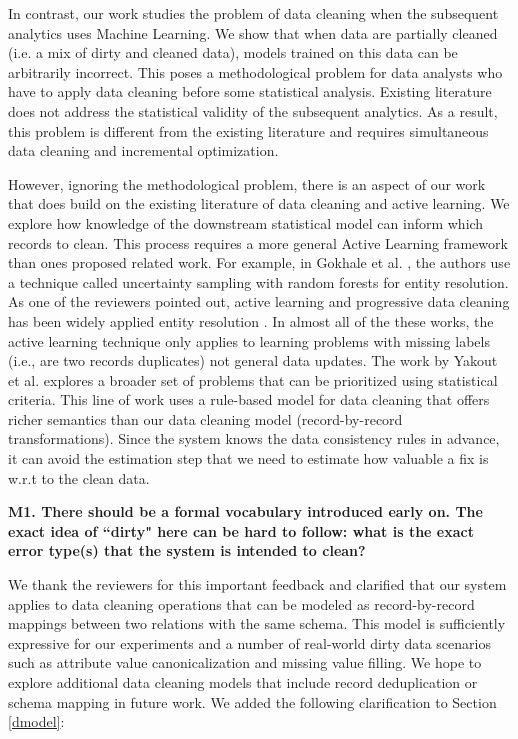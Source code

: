 In contrast, our work studies the problem of data cleaning when the subsequent analytics uses Machine Learning.
We show that when data are partially cleaned (i.e. a mix of dirty and cleaned data), models trained on this data can be arbitrarily incorrect.
This poses a methodological problem for data analysts who have to apply data cleaning before some statistical analysis.
Existing literature does not address the statistical validity of the subsequent analytics.
As a result, this problem is different from the existing literature and requires simultaneous data cleaning and incremental optimization.

However, ignoring the methodological problem, there is an aspect of our work that does build on the existing literature of data cleaning and active learning.
We explore how knowledge of the downstream statistical model can inform which records to clean.
This process requires a more general Active Learning framework than ones proposed related work.
For example, in Gokhale et al. \cite{gokhale2014corleone}, the authors use a technique called uncertainty sampling with random forests for entity resolution.
As one of the reviewers pointed out, active learning and progressive data cleaning has been widely applied entity resolution \cite{whang2014incremental, papenbrock2015progressive, gruenheid2014incremental}.
In almost all of the these works, the active learning technique only applies to learning problems with missing labels (i.e., are two records duplicates) not general data updates.
The work by Yakout et al. \cite{DBLP:journals/pvldb/YakoutENOI11, yakout2013don} explores a broader set of problems that can be prioritized using statistical criteria.
This line of work uses a rule-based model for data cleaning that offers richer semantics than our data cleaning model (record-by-record transformations).
Since the system knows the data consistency rules in advance, it can avoid the estimation step 
that we need to estimate how valuable a fix is w.r.t to the clean data. 

\vspace{0.5em}

\noindent\noindent \textbf{M1. There should be a formal vocabulary introduced early on. The exact idea of ``dirty" here can be hard to follow: what is the exact error type(s) that the system is intended to clean?}

\vspace{0.5em}

We thank the reviewers for this important feedback and clarified that our system applies to data cleaning operations that can be modeled as record-by-record mappings between two relations with the same schema.
This model is sufficiently expressive for our experiments and a number of real-world dirty data scenarios such as attribute value canonicalization and missing value filling.
We hope to explore additional data cleaning models that include record deduplication or schema mapping in future work.
We added the following clarification to Section \ref{dmodel}:

